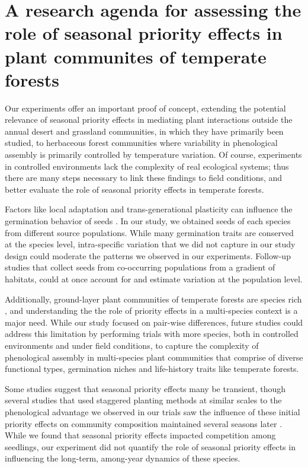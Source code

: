 \documentclass{article}[11pt]
\begin{document}
\section*{A research agenda for assessing the role of seasonal priority effects in plant communites of temperate forests}

Our experiments offer an important proof of concept, extending the potential relevance of seasonal priority effects in mediating plant interactions outside the annual desert and grassland communities, in which they have primarily been studied, to herbaceous forest communities where variability in phenological assembly is primarily controlled by temperature variation. Of course, experiments in controlled environments lack the complexity of real ecological systems; thus there are many steps necessary to link these findings to field conditions, and better evaluate the role of seasonal priority effects in temperate forests.

Factors like local adaptation and trans-generational plasticity can influence the germination behavior of seeds \citep{Donohue:2010uy,Baughman:2019ty}. In our study, we obtained seeds of each species from different source populations. While many germination traits are conserved at the species level, intra-specific variation that we did not capture in our study design could moderate the patterns we observed in our experiments. Follow-up studies that collect seeds from co-occurring populations from a gradient of habitats, could at once account for and estimate variation at the population level. 

Additionally, ground-layer plant communities of temperate forests are species rich \citep{Whigham:2004wy}, and understanding the the role of priority effects in a multi-species context is a major need. While our study focused on pair-wise differences, future studies could address this limitation by performing trials with more species, both in controlled environments and under field conditions, to capture the complexity of phenological assembly in multi-species plant communities that comprise of diverse functional types, germination niches and life-history traits like temperate forests.

Some studies suggest that seasonal priority effects many be transient, though several studies that used staggered planting methods at similar scales to the phenological advantage we observed in our trials saw the influence of these initial priority effects on community composition maintained several seasons later \citep{Vaughn:2015wp,Young:2017aa,Torrez:2017to}. While we found that seasonal priority effects impacted competition among seedlings, our experiment did not quantify the role of seasonal priority effects in influencing the long-term, among-year dynamics of these species.
\end{document}
